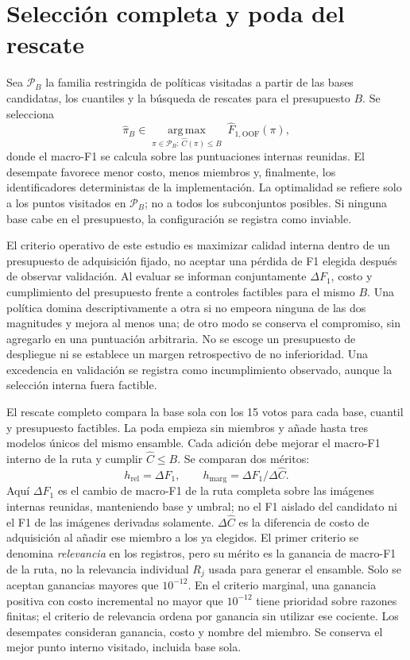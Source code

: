 \section{Selección completa y poda del rescate}
Sea $\mathcal P_B$ la familia restringida de políticas visitadas a partir de las bases candidatas, los cuantiles y la búsqueda de rescates para el presupuesto $B$. Se selecciona
\begin{equation}
\widehat\pi_B\in
\underset{\pi\in\mathcal P_B:\,\widehat C(\pi)\le B}
{\operatorname{arg\,max}}\;
\widehat F_{1,\mathrm{OOF}}(\pi),
\label{eq:policy-selection}
\end{equation}
donde el macro-F1 se calcula sobre las puntuaciones internas reunidas. El desempate favorece menor costo, menos miembros y, finalmente, los identificadores deterministas de la implementación. La optimalidad se refiere solo a los puntos visitados en $\mathcal P_B$; no a todos los subconjuntos posibles. Si ninguna base cabe en el presupuesto, la configuración se registra como inviable.

El criterio operativo de este estudio es maximizar calidad interna dentro de un presupuesto de adquisición fijado, no aceptar una pérdida de F1 elegida después de observar validación. Al evaluar se informan conjuntamente $\Delta F_1$, costo y cumplimiento del presupuesto frente a controles factibles para el mismo $B$. Una política domina descriptivamente a otra si no empeora ninguna de las dos magnitudes y mejora al menos una; de otro modo se conserva el compromiso, sin agregarlo en una puntuación arbitraria. No se escoge un presupuesto de despliegue ni se establece un margen retrospectivo de no inferioridad. Una excedencia en validación se registra como incumplimiento observado, aunque la selección interna fuera factible.

El rescate completo compara la base sola con los 15 votos para cada base, cuantil y presupuesto factibles. La poda empieza sin miembros y añade hasta tres modelos únicos del mismo ensamble. Cada adición debe mejorar el macro-F1 interno de la ruta y cumplir $\widehat C\le B$. Se comparan dos méritos:
\begin{equation}
h_{\mathrm{rel}}=\Delta F_1,\qquad
h_{\mathrm{marg}}=\Delta F_1/\Delta\widehat C .
\end{equation}
Aquí $\Delta F_1$ es el cambio de macro-F1 de la ruta completa sobre las imágenes internas reunidas, manteniendo base y umbral; no el F1 aislado del candidato ni el F1 de las imágenes derivadas solamente. $\Delta\widehat C$ es la diferencia de costo de adquisición al añadir ese miembro a los ya elegidos.
El primer criterio se denomina \emph{relevancia} en los registros, pero su mérito es la ganancia de macro-F1 de la ruta, no la relevancia individual $R_j$ usada para generar el ensamble. Solo se aceptan ganancias mayores que $10^{-12}$. En el criterio marginal, una ganancia positiva con costo incremental no mayor que $10^{-12}$ tiene prioridad sobre razones finitas; el criterio de relevancia ordena por ganancia sin utilizar ese cociente. Los desempates consideran ganancia, costo y nombre del miembro. Se conserva el mejor punto interno visitado, incluida base sola.

